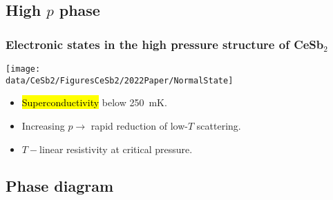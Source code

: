 \subsection{High $p$ phase}

\begin{frame}[label=NormalState]
\frametitle{Electronic states in the high pressure structure of CeSb$_2$}

\centerline{\texttt{[image: \\data/CeSb2/FiguresCeSb2/2022Paper/NormalState]}}

\begin{itemize}
\item \hl{Superconductivity} below \SI{250}{\milli\kelvin}.
\item Increasing $p \rightarrow$ rapid reduction of low-$T$ scattering. %
\item $T-$linear resistivity at critical pressure.

\end{itemize}


\end{frame}




\subsection{Phase diagram}

